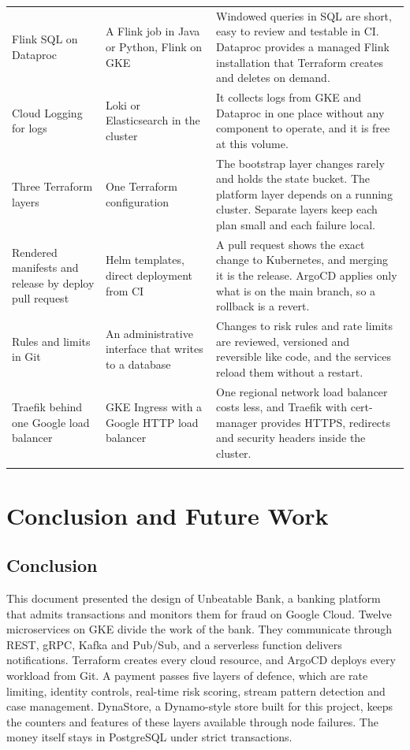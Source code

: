 \documentclass[11pt,a4paper]{article}
\newcommand{\project}{Unbeatable Bank}
\begin{document}
\begin{longtable}{@{}L{3.2cm}L{3.6cm}L{7.3cm}@{}}
Flink SQL on Dataproc & A Flink job in Java or Python, Flink on GKE & Windowed queries in SQL are short, easy to review and testable in CI. Dataproc provides a managed Flink installation that Terraform creates and deletes on demand. \\ \addlinespace[3pt]
Cloud Logging for logs & Loki or Elasticsearch in the cluster & It collects logs from GKE and Dataproc in one place without any component to operate, and it is free at this volume. \\ \addlinespace[3pt]
Three Terraform layers & One Terraform configuration & The bootstrap layer changes rarely and holds the state bucket. The platform layer depends on a running cluster. Separate layers keep each plan small and each failure local. \\ \addlinespace[3pt]
Rendered manifests and release by deploy pull request & Helm templates, direct deployment from CI & A pull request shows the exact change to Kubernetes, and merging it is the release. ArgoCD applies only what is on the main branch, so a rollback is a revert. \\ \addlinespace[3pt]
Rules and limits in Git & An administrative interface that writes to a database & Changes to risk rules and rate limits are reviewed, versioned and reversible like code, and the services reload them without a restart. \\ \addlinespace[3pt]
Traefik behind one Google load balancer & GKE Ingress with a Google HTTP load balancer & One regional network load balancer costs less, and Traefik with cert-manager provides HTTPS, redirects and security headers inside the cluster. \\ \addlinespace[3pt]
\bottomrule
\end{longtable}


\clearpage
\section{Conclusion and Future Work}
\label{sec:conclusion}

\subsection{Conclusion}

This document presented the design of \project{}, a banking platform that admits transactions and monitors them for fraud on Google Cloud. Twelve microservices on GKE divide the work of the bank. They communicate through REST, gRPC, Kafka and Pub/Sub, and a serverless function delivers notifications. Terraform creates every cloud resource, and ArgoCD deploys every workload from Git. A payment passes five layers of defence, which are rate limiting, identity controls, real-time risk scoring, stream pattern detection and case management. DynaStore, a Dynamo-style store built for this project, keeps the counters and features of these layers available through node failures. The money itself stays in PostgreSQL under strict transactions.
\end{document}
